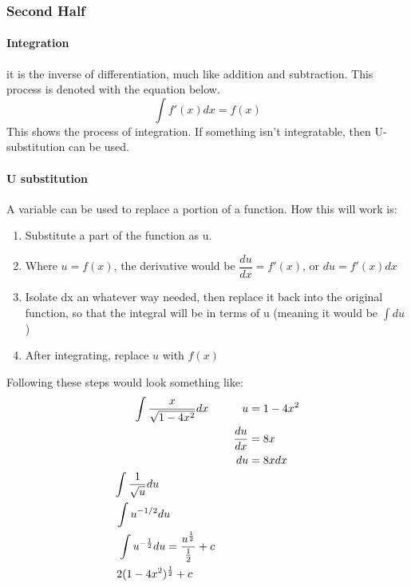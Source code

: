 \documentclass{article} %
\begin{document}
                \subsubsection{Second Half}
                    \paragraph{Integration}
                        it is the inverse of differentiation, much like addition and subtraction. This process is denoted with the equation below.
                        $$\int f'(x)dx = f(x)$$
                        This shows the process of integration. If something isn't integratable, then U-substitution can be used.
                    \paragraph{U substitution}
                        A variable can be used to replace a portion of a function. How this will work is:
                        \begin{enumerate}
                            \item Substitute a part of the function as u.
                            \item Where $u = f(x)$, the derivative would be $\dfrac{du}{dx} = f'(x)$, or $du = f'(x)dx$
                            \item Isolate dx an whatever way needed, then replace it back into the original function, so that the integral will be in terms of u (meaning it would be $\int du$)
                            \item After integrating, replace $u$ with $f(x)$
                        \end{enumerate}
                        Following these steps would look something like:
                        \begin{align*}
                            \int \dfrac{x}{\sqrt{1-4x^2}}dx \hspace{30px}
                            u &= 1-4x^2\\
                            \dfrac{du}{dx} &= 8x\\
                            du&=8xdx \\
                            \int \dfrac{1}{\sqrt{u}}du \hspace{80px}\\
                            \int u^{-1/2}du \hspace{70px}\\
                            \int u^{-\frac{1}{2}}du = \dfrac{u^{\frac{1}{2}}}{\frac{1}{2}}+c\hspace{30px}\\
                            2(1-4x^2)^{\frac{1}{2}}+c\hspace*{50px}
                        \end{align*}
\end{document}
